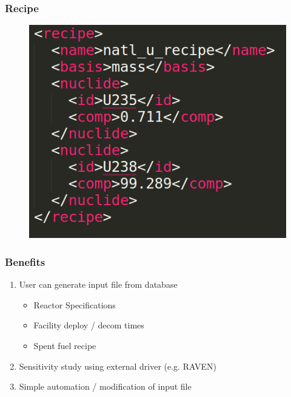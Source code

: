 \begin{frame}
    \frametitle{Recipe}
\begin{figure}[htbp!]
        \begin{center}
                \includegraphics[width=.8\textwidth]{./images/recipe.png}
        \end{center}
    \end{figure}
\end{frame}


\begin{frame}
    \frametitle{Benefits}
    \begin{enumerate}
        \item User can generate input file from database
        \begin{itemize}
            \item Reactor Specifications
            \item Facility deploy / decom times
            \item Spent fuel recipe
        \end{itemize}
        \item Sensitivity study using external driver (e.g. RAVEN)
        \item Simple automation / modification of input file
    \end{enumerate}
\end{frame}

